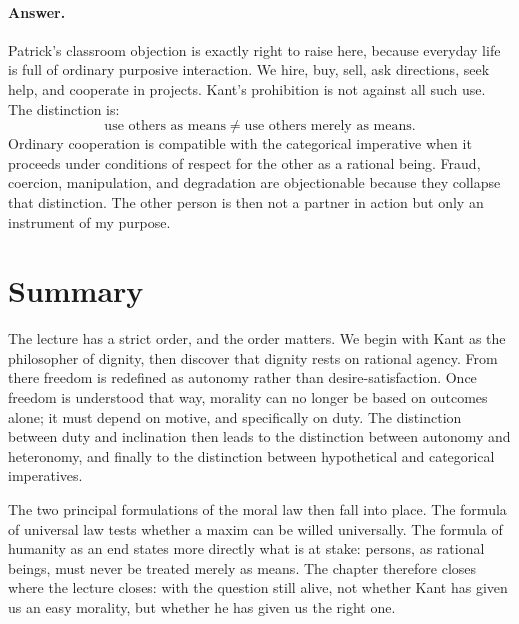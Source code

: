 \paragraph{Answer.} Patrick's classroom objection is exactly right to raise here, because everyday life is full of ordinary purposive interaction. We hire, buy, sell, ask directions, seek help, and cooperate in projects. Kant's prohibition is not against all such use. The distinction is:
\begin{equation}
\text{use others as means} \neq \text{use others merely as means}.
\end{equation}
Ordinary cooperation is compatible with the categorical imperative when it proceeds under conditions of respect for the other as a rational being. Fraud, coercion, manipulation, and degradation are objectionable because they collapse that distinction. The other person is then not a partner in action but only an instrument of my purpose.

\section{Summary}

The lecture has a strict order, and the order matters. We begin with Kant as the philosopher of dignity, then discover that dignity rests on rational agency. From there freedom is redefined as autonomy rather than desire-satisfaction. Once freedom is understood that way, morality can no longer be based on outcomes alone; it must depend on motive, and specifically on duty. The distinction between duty and inclination then leads to the distinction between autonomy and heteronomy, and finally to the distinction between hypothetical and categorical imperatives.

The two principal formulations of the moral law then fall into place. The formula of universal law tests whether a maxim can be willed universally. The formula of humanity as an end states more directly what is at stake: persons, as rational beings, must never be treated merely as means. The chapter therefore closes where the lecture closes: with the question still alive, not whether Kant has given us an easy morality, but whether he has given us the right one.